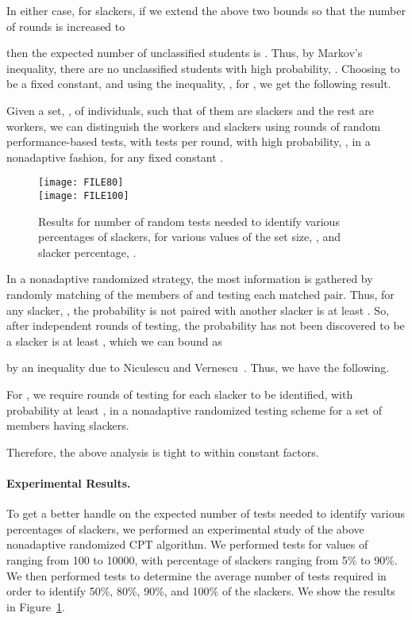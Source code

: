 \documentclass[11pt]{llncs}
\renewcommand{\subsection}[1]{\paragraph{\bf #1.}}
\begin{document}
In either case, for  slackers, if we 
extend the above two bounds so that the number of rounds is increased to

then the expected number of 
unclassified students is .
Thus, by Markov's inequality, there are no unclassified students
with high probability, .
Choosing  to be a fixed constant, and using the inequality,
, for , we get the following result.

\begin{theorem}
Given a set, , of  individuals, such that  of 
them are slackers and the rest are workers, we can distinguish the workers
and slackers using  rounds of 
random performance-based tests, with  tests per round, with high
probability, , in a nonadaptive fashion, for any fixed constant
.
\end{theorem}

\begin{figure}[p]
\begin{center}
\texttt{[image: FILE80]} \\
\texttt{[image: FILE100]} 
\caption{\label{fig-results} Results for number of random tests needed
to identify various percentages of slackers, for various values of the set
size, , and slacker percentage, .}
\end{center}
\end{figure}

In a nonadaptive randomized strategy, the most information is gathered by
randomly matching of the members of  and testing each matched
pair.
Thus, for any slacker, , the probability  is not paired with 
another slacker is at least .
So, after  independent rounds of testing, the probability  has not
been discovered to be a slacker is at least , which
we can bound as

by an inequality due to Niculescu and Vernescu~\cite{niculescu2004two}.
Thus, we have the following.

\begin{theorem}
For , we require  rounds
of testing for each slacker to be identified, with probability at least
, in a nonadaptive randomized testing scheme for a set of 
members having  slackers.
\end{theorem}

Therefore, the above analysis is tight to within constant factors.

\subsection{Experimental Results}
To get a better handle on the expected number of tests needed
to identify various percentages of slackers, we performed an experimental
study of the above nonadaptive randomized CPT algorithm.
We performed tests for values of  ranging from 100 to 10000, with 
percentage of slackers ranging from 5\% to 90\%.
We then performed tests to determine the average number of tests required 
in order to identify 50\%, 80\%, 90\%, and 100\% of the slackers.
We show the results in Figure~\ref{fig-results}.
\end{document}
